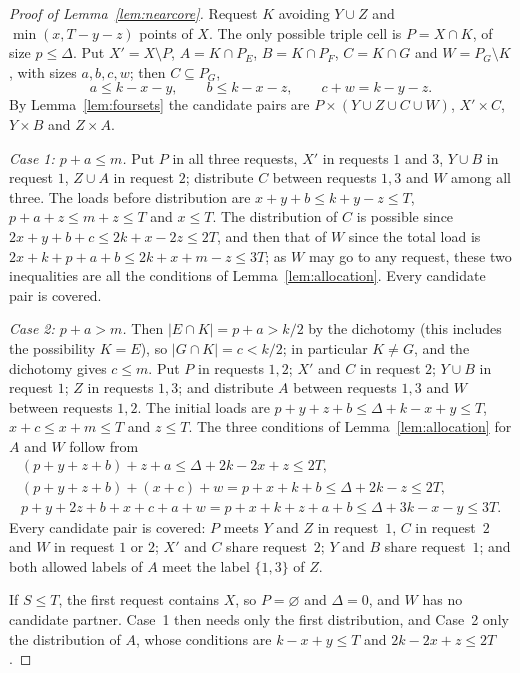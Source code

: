 \documentclass[11pt]{article}
\numberwithin{equation}{section}
\theoremstyle{definition}
\theoremstyle{remark}
\begin{document}
\begin{proof}[Proof of Lemma~\ref{lem:nearcore}]
Request $K$ avoiding $Y\cup Z$ and $\min(x,T-y-z)$ points of $X$. The only
possible triple cell is $P=X\cap K$, of size $p\le\Delta$. Put
$X'=X\setminus P$, $A=K\cap P_E$, $B=K\cap P_F$, $C=K\cap G$ and
$W=P_G\setminus K$, with sizes $a,b,c,w$; then $C\subseteq P_G$,
\[
 a\le k-x-y,\qquad b\le k-x-z,\qquad c+w=k-y-z .
\]
By Lemma~\ref{lem:foursets} the candidate pairs are
$P\times(Y\cup Z\cup C\cup W)$, $X'\times C$, $Y\times B$ and $Z\times A$.

\emph{Case 1: $p+a\le m$.} Put $P$ in all three requests, $X'$ in
requests $1$ and $3$, $Y\cup B$ in request $1$, $Z\cup A$ in request $2$;
distribute $C$ between requests $1,3$ and $W$ among all three. The loads
before distribution are $x+y+b\le k+y-z\le T$, $p+a+z\le m+z\le T$ and
$x\le T$. The distribution of $C$ is possible since
$2x+y+b+c\le2k+x-2z\le2T$, and then that of $W$ since the total load is
$2x+k+p+a+b\le2k+x+m-z\le3T$; as $W$ may go to any request, these two
inequalities are all the conditions of Lemma~\ref{lem:allocation}. Every candidate pair is covered.

\emph{Case 2: $p+a>m$.} Then $|E\cap K|=p+a>k/2$ by the dichotomy (this
includes the possibility $K=E$), so $|G\cap K|=c<k/2$; in particular
$K\ne G$, and the dichotomy gives $c\le m$. Put $P$ in requests $1,2$; $X'$ and $C$ in
request $2$; $Y\cup B$ in request $1$; $Z$ in requests $1,3$; and
distribute $A$ between requests $1,3$ and $W$ between requests $1,2$. The
initial loads are $p+y+z+b\le\Delta+k-x+y\le T$, $x+c\le x+m\le T$ and
$z\le T$. The three conditions of Lemma~\ref{lem:allocation} for $A$ and
$W$ follow from
\begin{gather*}
 (p+y+z+b)+z+a\le\Delta+2k-2x+z\le2T,\\
 (p+y+z+b)+(x+c)+w=p+x+k+b\le\Delta+2k-z\le2T,\\
 p+y+2z+b+x+c+a+w=p+x+k+z+a+b\le\Delta+3k-x-y\le3T .
\end{gather*}
Every candidate pair is covered: $P$ meets $Y$ and $Z$ in request~$1$,
$C$ in request~$2$ and $W$ in request $1$ or $2$; $X'$ and $C$ share
request~$2$; $Y$ and $B$ share request~$1$; and both allowed labels of
$A$ meet the label $\{1,3\}$ of $Z$.

If $S\le T$, the first request contains $X$, so $P=\varnothing$ and
$\Delta=0$, and $W$ has no candidate partner. Case~1 then needs only the
first distribution, and Case~2 only the distribution of $A$, whose
conditions are $k-x+y\le T$ and $2k-2x+z\le2T$.
\end{proof}
\end{document}

